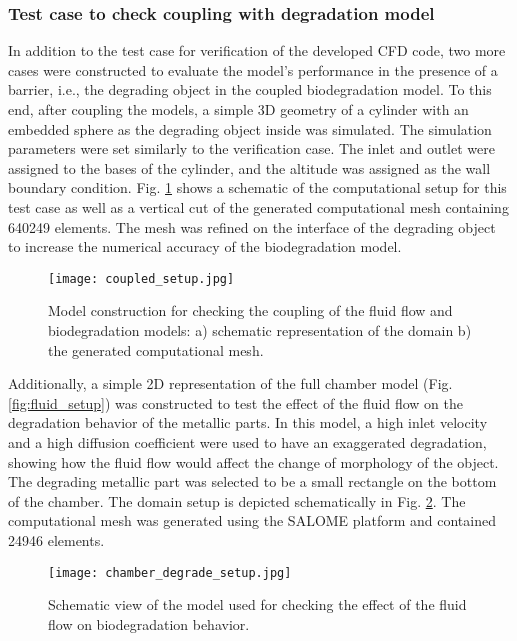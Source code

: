 \subsubsection{Test case to check coupling with degradation model}

In addition to the test case for verification of the developed {CFD} code, two more cases were constructed to evaluate the model's performance in the presence of a barrier, i.e., the degrading object in the coupled biodegradation model. To this end, after coupling the models, a simple 3D geometry of a cylinder with an embedded sphere as the degrading object inside was simulated. The simulation parameters were set similarly to the verification case. The inlet and outlet were assigned to the bases of the cylinder, and the altitude was assigned as the wall boundary condition. Fig. \ref{fig:fluid_coupled_setup} shows a schematic of the computational setup for this test case as well as a vertical cut of the generated computational mesh containing \num{640249} elements. The mesh was refined on the interface of the degrading object to increase the numerical accuracy of the biodegradation model.


\begin{figure}[h]
\centering
\medskip
\texttt{[image: coupled\_setup.jpg]}
\caption[Model construction for checking the coupling of the fluid flow and biodegradation models]{Model construction for checking the coupling of the fluid flow and biodegradation models: a) schematic representation of the domain b) the generated computational mesh.} \label{fig:fluid_coupled_setup}
\end{figure}

Additionally, a simple 2D representation of the full chamber model (Fig. \ref{fig:fluid_setup}) was constructed to test the effect of the fluid flow on the degradation behavior of the metallic parts. In this model, a high inlet velocity and a high diffusion coefficient were used to have an exaggerated degradation, showing how the fluid flow would affect the change of morphology of the object. The degrading metallic part was selected to be a small rectangle on the bottom of the chamber. The domain setup is depicted schematically in Fig. \ref{fig:fluid_chamber_degrade_setup}. The computational mesh was generated using the SALOME platform and contained \num{24946} elements.

\begin{figure}[h]
\centering
\medskip
\texttt{[image: chamber\_degrade\_setup.jpg]}
\caption[Schematic view of the model for checking the effect of fluid flow on biodegradation behavior]{Schematic view of the model used for checking the effect of the fluid flow on biodegradation behavior.} \label{fig:fluid_chamber_degrade_setup}
\end{figure}

